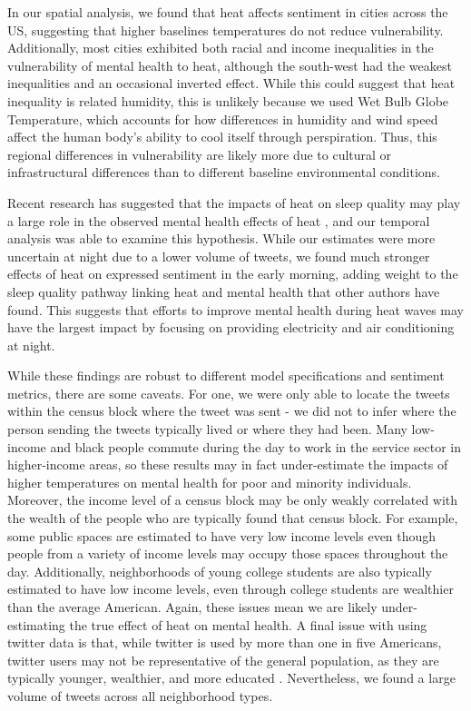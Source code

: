 \documentclass[fleqn,10pt]{wlscirep}
\begin{document}
In our spatial analysis, we found that heat affects sentiment in cities across the US, suggesting that higher baselines temperatures do not reduce vulnerability.   Additionally, most cities exhibited both racial and income inequalities in the vulnerability of mental health to heat, although the south-west had the weakest inequalities and an occasional inverted effect.  While this could suggest that heat inequality is related humidity, this is unlikely because we used Wet Bulb Globe Temperature, which accounts for how differences in humidity and wind speed affect the human body's ability to cool itself through perspiration.  Thus, this regional differences in vulnerability are likely more due to cultural or infrastructural differences than to different baseline environmental conditions.

Recent research has suggested that the impacts of heat on sleep quality may play a large role in the observed mental health effects of heat \cite{Obradovich2017May, Mullins2019Dec}, and our temporal analysis was able to examine this hypothesis.  While our estimates were more uncertain at night due to a lower volume of tweets, we found much stronger effects of heat on expressed sentiment in the early morning, adding weight to the sleep quality pathway linking heat and mental health that other authors have found.  This suggests that efforts to improve mental health during heat waves may have the largest impact by focusing on providing electricity and air conditioning at night.

While these findings are robust to different model specifications and sentiment metrics, there are some caveats.  For one, we were only able to locate the tweets within the census block where the tweet was sent - we did not to infer where the person sending the tweets typically lived or where they had been.  Many low-income and black people commute during the day to work in the service sector in higher-income areas, so these results may in fact under-estimate the impacts of higher temperatures on mental health for poor and minority individuals.  Moreover, the income level of a census block may be only weakly correlated with the wealth of the people who are typically found that census block.  For example, some public spaces are estimated to have very low income levels even though people from a variety of income levels may occupy those spaces throughout the day.  Additionally, neighborhoods of young college students are also typically estimated to have low income levels, even through college students are wealthier than the average American.  Again, these issues mean we are likely under-estimating the true effect of heat on mental health.  A final issue with using twitter data is that, while twitter is used by more than one in five Americans, twitter users may not be representative of the general population, as they are typically younger, wealthier, and more educated \cite{Pew2020Sep}.  Nevertheless, we found a large volume of tweets across all neighborhood types.
\end{document}
